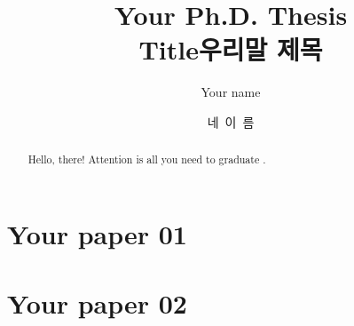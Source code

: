 \documentclass[oneside,phd]{snuthesis}
\title{Your Ph.D. Thesis \\ Title}
\title*{우리말 제목}
\author{Your name}
\author*{네~이~름} %
\begin{document}
\makefrontcover
\makefrontcover
\makeapproval

\iffalse

\thispagestyle{empty}
\newpage
\mbox{}
\newpage

\makefrontcover
\makeapproval

\fi

\cleardoublepage
{}

\begin{abstract}
    Hello, there! Attention is all you need to graduate \cite{Vaswani:2017:NeurIPS}.
\end{abstract}

\tableofcontents
\listoffigures
\listoftables

\cleardoublepage
{}






\chapter{Your paper 01}
\label{chp:paper01}




\chapter{Your paper 02}
\label{chp:paper02}














\end{document}
